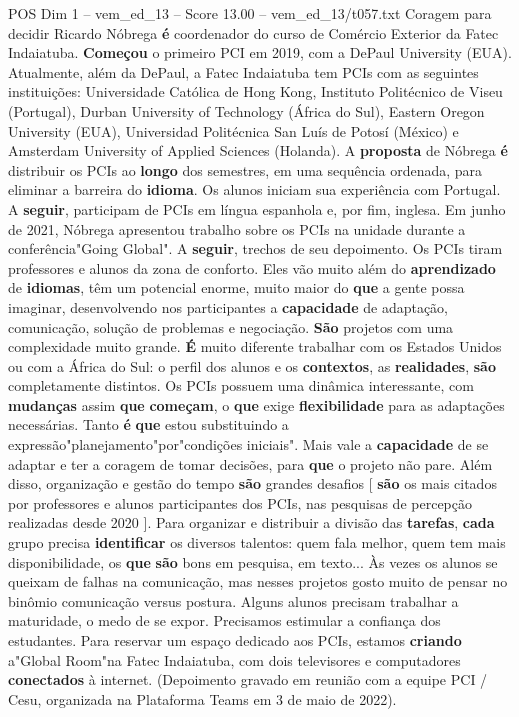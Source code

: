 \begin{textsample}{POS Dim 1 – vem\_ed\_13 – Score 13.00 – vem\_ed\_13/t057.txt}  \label{ex:f1_pos_124}
Coragem para decidir Ricardo Nóbrega \textbf{é} coordenador do curso de Comércio Exterior da Fatec Indaiatuba. \textbf{Começou} o primeiro PCI em 2019, com a DePaul University (EUA).
Atualmente, além da DePaul, a Fatec Indaiatuba tem PCIs com as seguintes instituições: Universidade Católica de Hong Kong, Instituto Politécnico de Viseu (Portugal), Durban University of Technology (África do Sul), Eastern Oregon University (EUA), Universidad Politécnica San Luís de Potosí (México) e Amsterdam University of Applied Sciences (Holanda).
A \textbf{proposta} de Nóbrega \textbf{é} distribuir os PCIs ao \textbf{longo} dos semestres, em uma sequência ordenada, para eliminar a barreira do \textbf{idioma}.
Os alunos iniciam sua experiência com Portugal.
A \textbf{seguir}, participam de PCIs em língua espanhola e, por fim, inglesa.
Em junho de 2021, Nóbrega apresentou trabalho sobre os PCIs na unidade durante a conferência"Going Global".
A \textbf{seguir}, trechos de seu depoimento.
Os PCIs tiram professores e alunos da zona de conforto.
Eles vão muito além do \textbf{aprendizado} de \textbf{idiomas}, têm um potencial enorme, muito maior do \textbf{que} a gente possa imaginar, desenvolvendo nos participantes a \textbf{capacidade} de adaptação, comunicação, solução de problemas e negociação. \textbf{São} projetos com uma complexidade muito grande. \textbf{É} muito diferente trabalhar com os Estados Unidos ou com a África do Sul: o perfil dos alunos e os \textbf{contextos}, as \textbf{realidades}, \textbf{são} completamente distintos.
Os PCIs possuem uma dinâmica interessante, com \textbf{mudanças} assim \textbf{que} \textbf{começam}, o \textbf{que} exige \textbf{flexibilidade} para as adaptações necessárias.
Tanto \textbf{é} \textbf{que} estou substituindo a expressão"planejamento"por"condições iniciais".
Mais vale a \textbf{capacidade} de se adaptar e ter a coragem de tomar decisões, para \textbf{que} o projeto não pare.
Além disso, organização e gestão do tempo \textbf{são} grandes desafios [ \textbf{são} os mais citados por professores e alunos participantes dos PCIs, nas pesquisas de percepção realizadas desde 2020 ].
Para organizar e distribuir a divisão das \textbf{tarefas}, \textbf{cada} grupo precisa \textbf{identificar} os diversos talentos: quem fala melhor, quem tem mais disponibilidade, os \textbf{que} \textbf{são} bons em pesquisa, em texto... Às vezes os alunos se queixam de falhas na comunicação, mas nesses projetos gosto muito de pensar no binômio comunicação versus postura.
Alguns alunos precisam trabalhar a maturidade, o medo de se expor.
Precisamos estimular a confiança dos estudantes.
Para reservar um espaço dedicado aos PCIs, estamos \textbf{criando} a"Global Room"na Fatec Indaiatuba, com dois televisores e computadores \textbf{conectados} à internet. (Depoimento gravado em reunião com a equipe PCI / Cesu, organizada na Plataforma Teams em 3 de maio de 2022).

\end{textsample}
